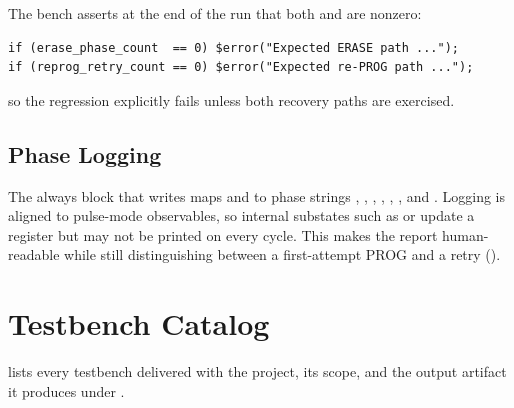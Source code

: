 The bench asserts at the end of the run that both
 and  are
nonzero:

\begin{lstlisting}[style=svstyle]
if (erase_phase_count  == 0) $error("Expected ERASE path ...");
if (reprog_retry_count == 0) $error("Expected re-PROG path ...");
\end{lstlisting}

so the regression explicitly fails unless both recovery paths are
exercised.

\subsection{Phase Logging}
\label{sec:verif-injection-phases}

The always block that writes
 maps
 and  to phase strings
, , , , ,
, and . Logging is aligned to
pulse-mode observables, so internal substates such as  or
 update a  register but may not be
printed on every cycle. This makes the report human-readable while still
distinguishing between a first-attempt PROG and a retry ().

\section{Testbench Catalog}
\label{sec:verif-catalog}

 lists every testbench delivered with the project,
its scope, and the output artifact it produces under .

